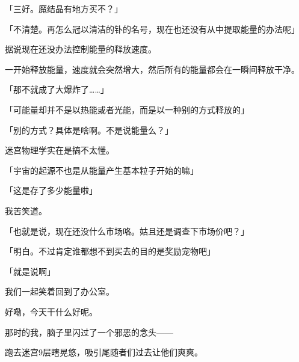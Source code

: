 「三好。魔结晶有地方买不？」

「不清楚。再怎么冠以清洁的钋的名号，现在也还没有从中提取能量的办法呢」

据说现在还没办法控制能量的释放速度。

一开始释放能量，速度就会突然增大，然后所有的能量都会在一瞬间释放干净。

「那不就成了大爆炸了……」

「可能量却并不是以热能或者光能，而是以一种别的方式释放的」

「别的方式？具体是啥啊。不是说能量么？」

迷宫物理学实在是搞不太懂。

「宇宙的起源不也是从能量产生基本粒子开始的嘛」

「这是存了多少能量啦」

我苦笑道。

「也就是说，现在还没什么市场咯。姑且还是调查下市场价吧？」

「明白。不过肯定谁都想不到买去的目的是奖励宠物吧」

「就是说啊」

我们一起笑着回到了办公室。

好嘞，今天干什么好呢。

那时的我，脑子里闪过了一个邪恶的念头——

跑去迷宫9层瞎晃悠，吸引尾随者们过去让他们爽爽。

